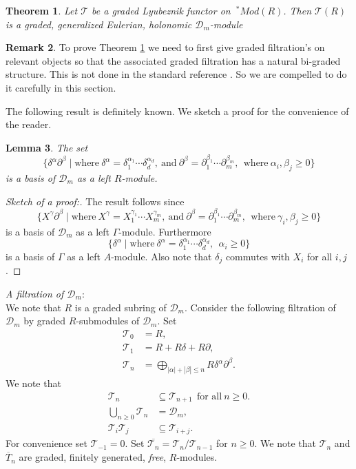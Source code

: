 \documentclass{amsart}
\newcommand{\D}{\mathcal{D} }
\newcommand{\T}{\mathcal{T} }
\newcommand{\ov}{\overline}
\newcommand{\FF}{\mathcal{T}}
\theoremstyle{plain}
\newtheorem{theorem}{Theorem}[section]
\newtheorem{lemma}[theorem]{Lemma}
\theoremstyle{definition}
\newtheorem{remark}[theorem]{Remark}
\theoremstyle{remark}
\begin{document}
\begin{theorem}\label{mom}
Let $\FF$ be a graded Lyubeznik functor on $ \ ^* Mod(R)$. Then $\FF(R)$ is a graded, generalized Eulerian,  holonomic $\D_m$-module
\end{theorem}



\begin{remark}
To prove Theorem \ref{mom} we need to first give  graded filtration's on relevant objects so that the associated graded filtration has a natural bi-graded structure. This is not done in  the standard reference \cite{Bjork}. So we are compelled to do it carefully in this section.
\end{remark}

The following result is definitely known. We sketch a proof for the convenience of the reader.
\begin{lemma}\label{basis}
 The set 
 $$\{ \delta^{\alpha} \partial^\beta \mid  \text{where} \ \delta^\alpha = \delta_1^{\alpha_1}\cdots\delta_d^{\alpha_d}, \ 
 \text{and} \ \partial^\beta = \partial_1^{\beta_1}\cdots \partial_m^{\beta_m}, \ \ \text{where} 
 \ \alpha_i, \beta_j \geq 0 \} $$
 is a basis of $\D_m$ as a left $R$-module.
 \end{lemma}
\begin{proof}[Sketch of a proof:]
 The result follows since
  $$\{ {X}^{\gamma} \partial^\beta \mid  \text{where} \  X^\gamma = X_1^{\gamma_1}\cdots X_m^{\gamma_m}, \ 
 \text{and} \ \partial^\beta = \partial_1^{\beta_1}\cdots \partial_m^{\beta_m}, \ \ \text{where} 
 \ \gamma_i, \beta_j \geq 0 \} $$
 is a basis of $\D_m$ as a left $\Gamma$-module.  Furthermore
 $$\{ \delta^{\alpha} \mid  \text{where} \ \delta^\alpha = \delta_1^{\alpha_1}\cdots\delta_d^{\alpha_d}, \ 
 \ \alpha_i \geq 0 \} $$
 is a basis of $\Gamma$ as a left $A$-module. Also note that $\delta_j$ commutes with $X_i$ for all $i,j$.
\end{proof}

\s \label{filt} \emph{A filtration of $\D_m$}: \\
We note that $R$ is a graded subring of $\D_m$. Consider the following filtration of $\D_m$ by graded $R$-submodules of $\D_m$.
Set 
\begin{align*}
 \T_0 &= R, \\
 \T_1 &= R + R\delta + R \partial,\\
 \T_n &= \bigoplus_{|\alpha| + |\beta| \leq n} R \delta^\alpha \partial^\beta.
\end{align*}
We note that
\begin{align*}
 \T_n &\subseteq \T_{n+1} \ \ \text{for all} \ n \geq 0.\\
 \bigcup_{n \geq 0} \T_n &= \D_m, \\
 \T_i \T_j &\subseteq \T_{i+j}.
\end{align*}
For convenience set $\T_{-1} = 0$.
Set $\ov{\T_n} = \T_n/\T_{n-1}$ for $n \geq 0$.  We note that $\T_n$ and $\ov{T}_n$ are graded, finitely generated, \emph{free}, $R$-modules.
 
\end{document}
